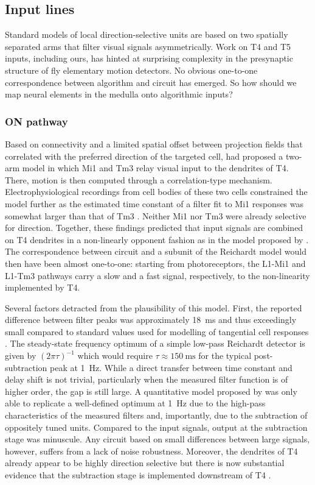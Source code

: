 \subsection{Input lines}
Standard models of local direction-selective units are based on two spatially separated arms that filter visual signals asymmetrically. Work on T4 and T5 inputs, including ours, has hinted at surprising complexity in the presynaptic structure of fly elementary motion detectors. No obvious one-to-one correspondence between algorithm and circuit has emerged. So how should we map neural elements in the medulla onto algorithmic inputs?


\subsubsection{ON pathway}
Based on connectivity and a limited spatial offset between projection fields that correlated with the preferred direction of the targeted cell, \citet{Takemura:2013ea} had proposed a two-arm model in which Mi1 and Tm3 relay visual input to the dendrites of T4. There, motion is then computed through a correlation-type mechanism. Electrophysiological recordings from cell bodies of these two cells constrained the model further as the estimated time constant of a filter fit to Mi1 responses was somewhat larger than that of Tm3 \citep{Behnia:2014jh}. Neither Mi1 nor Tm3 were already selective for direction. Together, these findings predicted that input signals are combined on T4 dendrites in a non-linearly opponent fashion as in the model proposed by \citet{Barlow:1965aa}. The correspondence between circuit and a subunit of the Reichardt model would then have been almost one-to-one: starting from photoreceptors, the L1-Mi1 and L1-Tm3 pathways carry a slow and a fast signal, respectively, to the non-linearity implemented by T4.

Several factors detracted from the plausibility of this model. First, the reported difference between filter peaks was approximately \SI{18}{\milli\second} and thus exceedingly small compared to standard values used for modelling of tangential cell responses \citep{Behnia:2014jh}. The steady-state frequency optimum of a simple low-pass Reichardt detector is given by $(2 \pi \tau)^{-1}$ which would require $\tau \approx \SI{150}{\milli\second}$ for the typical post-subtraction peak at \SI{1}{\hertz}. While a direct transfer between time constant and delay shift is not trivial, particularly when the measured filter function is of higher order, the gap is still large. A quantitative model proposed by \citet{Behnia:2014jh} was only able to replicate a well-defined optimum at \SI{1}{\hertz} due to the high-pass characteristics of the measured filters and, importantly, due to the subtraction of oppositely tuned units. Compared to the input signals, output at the subtraction stage was minuscule. Any circuit based on small differences between large signals, however, suffers from a lack of noise robustness. Moreover, the dendrites of T4 already appear to be highly direction selective but there is now substantial evidence that the subtraction stage is implemented downstream of T4 \citep[see][and the sections below]{Mauss:2015kj}.


